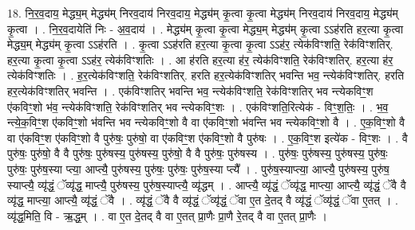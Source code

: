 \documentclass[17pt]{extarticle}
\begin{document}
18. नि॒र॒व॒दाय॒ मेद्ध्य॒म् मेद्ध्य॑म् निरव॒दाय॑ निरव॒दाय॒ मेद्ध्य॑म् कृ॒त्वा कृ॒त्वा मेद्ध्य॑म् निरव॒दाय॑ निरव॒दाय॒ मेद्ध्य॑म् कृ॒त्वा । . नि॒र॒व॒दायेति॑ निः - अ॒व॒दाय॑ । . मेद्ध्य॑म् कृ॒त्वा कृ॒त्वा मेद्ध्य॒म् मेद्ध्य॑म् कृ॒त्वा ऽऽह॑रति हर॒त्या कृ॒त्वा मेद्ध्य॒म् मेद्ध्य॑म् कृ॒त्वा ऽऽह॑रति । . कृ॒त्वा ऽऽह॑रति हर॒त्या कृ॒त्वा कृ॒त्वा ऽऽह॑र॒ त्येक॑विꣳशति॒ रेक॑विꣳशतिर्. हर॒त्या कृ॒त्वा कृ॒त्वा ऽऽह॑र॒ त्येक॑विꣳशतिः । . आ ह॑रति हर॒त्या ह॑र॒ त्येक॑विꣳशति॒ रेक॑विꣳशतिर्. हर॒त्या ह॑र॒ त्येक॑विꣳशतिः । . ह॒र॒त्येक॑विꣳशति॒ रेक॑विꣳशतिर्. हरति हर॒त्येक॑विꣳशतिर् भवन्ति भव॒ न्त्येक॑विꣳशतिर्. हरति हर॒त्येक॑विꣳशतिर् भवन्ति । . एक॑विꣳशतिर् भवन्ति भव॒ न्त्येक॑विꣳशति॒ रेक॑विꣳशतिर् भव न्त्येकविꣳ॒॒श ए॑कविꣳ॒॒शो भ॑व॒ न्त्येक॑विꣳशति॒ रेक॑विꣳशतिर् भव न्त्येकविꣳ॒॒शः । . एक॑विꣳशति॒रित्येक॑ - विꣳ॒॒श॒तिः॒ । . भ॒व॒ न्त्ये॒क॒विꣳ॒॒श ए॑कविꣳ॒॒शो भ॑वन्ति भव न्त्येकविꣳ॒॒शो वै वा ए॑कविꣳ॒॒शो भ॑वन्ति भव न्त्येकविꣳ॒॒शो वै । . ए॒क॒विꣳ॒॒शो वै वा ए॑कविꣳ॒॒श ए॑कविꣳ॒॒शो वै पुरु॑षः॒ पुरु॑षो॒ वा ए॑कविꣳ॒॒श ए॑कविꣳ॒॒शो वै पुरु॑षः । . ए॒क॒विꣳ॒॒श इत्ये॑क - विꣳ॒॒शः । . वै पुरु॑षः॒ पुरु॑षो॒ वै वै पुरु॑षः॒ पुरु॑षस्य॒ पुरु॑षस्य॒ पुरु॑षो॒ वै वै पुरु॑षः॒ पुरु॑षस्य । . पुरु॑षः॒ पुरु॑षस्य॒ पुरु॑षस्य॒ पुरु॑षः॒ पुरु॑षः॒ पुरु॑ष॒स्या प्त्या॒ आप्त्यै॒ पुरु॑षस्य॒ पुरु॑षः॒ पुरु॑षः॒ पुरु॑ष॒स्या प्त्यै᳚ । . पुरु॑ष॒स्याप्त्या॒ आप्त्यै॒ पुरु॑षस्य॒ पुरु॑ष॒ स्याप्त्यै॒ व्यृ॑द्धं॒ ॅव्यृ॑द्ध॒ माप्त्यै॒ पुरु॑षस्य॒ पुरु॑ष॒स्याप्त्यै॒ व्यृ॑द्धम् । . आप्त्यै॒ व्यृ॑द्धं॒ ॅव्यृ॑द्ध॒ माप्त्या॒ आप्त्यै॒ व्यृ॑द्धं॒ ॅवै वै व्यृ॑द्ध॒ माप्त्या॒ आप्त्यै॒ व्यृ॑द्धं॒ ॅवै । . व्यृ॑द्धं॒ ॅवै वै व्यृ॑द्धं॒ ॅव्यृ॑द्धं॒ ॅवा ए॒त दे॒तद् वै व्यृ॑द्धं॒ ॅव्यृ॑द्धं॒ ॅवा ए॒तत् । . व्यृ॑द्ध॒मिति॒ वि - ऋ॒द्ध॒म् । . वा ए॒त दे॒तद् वै वा ए॒तत् प्रा॒णैः प्रा॒णै रे॒तद् वै वा ए॒तत् प्रा॒णैः । \newline
\end{document}
